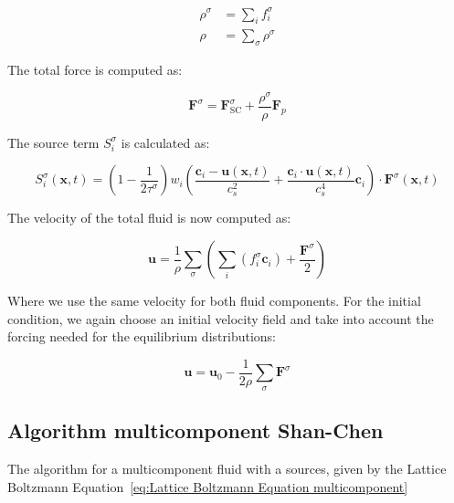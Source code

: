 \begin{equation}\label{eq:Multicomponent densities}
\begin{split}
    \rho^\sigma &= \sum_i f_i^\sigma\\
    \rho &= \sum_\sigma \rho^\sigma
\end{split}
\end{equation}

The total force is computed as:

\begin{equation}\label{eq:Total force Shan-Chen}
    \bm{F}^\sigma = \bm{F}^\sigma_{\text{SC}} + \frac{\rho^\sigma}{\rho}\bm{F}_p
\end{equation}

The source term $S_i^\sigma$ is calculated as:

\begin{equation}\label{eq:Source term multicomponent}
    S_i^\sigma(\bm{x}, t) = \left(1 - \frac{1}{2\tau^\sigma}\right) w_i \left(\frac{\bm{c}_i - \bm{u}(\bm{x}, t)}{c_s^2} + \frac{\bm{c}_i \cdot \bm{u}(\bm{x}, t)}{c_s^4}\bm{c}_i\right) \cdot \bm{F}^\sigma(\bm{x}, t)
\end{equation}

The velocity of the total fluid is now computed as:

\begin{equation}\label{eq:Shan-Chen velocity}
    \bm{u} = \frac{1}{\rho} \sum_\sigma \left(\sum_i \left(f_i^\sigma \bm{c}_i\right) + \frac{\bm{F}^\sigma}{2}\right)
\end{equation}

Where we use the same velocity for both fluid components. For the initial condition, we again choose an initial velocity field and take into account the forcing needed for the equilibrium distributions:

\begin{equation}
    \bm{u} = \bm{u}_0 - \frac{1}{2\rho}\sum_\sigma \bm{F}^\sigma
\end{equation}

\subsection{Algorithm multicomponent Shan-Chen}
The algorithm for a multicomponent fluid with a sources, given by the Lattice Boltzmann Equation~\ref{eq:Lattice Boltzmann Equation multicomponent}

